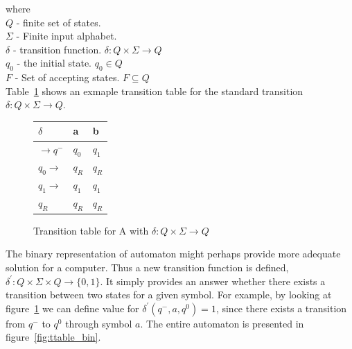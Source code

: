 \documentclass{article}
\begin{document}
where \\
$Q$ - finite set of states. \\
$\Sigma$ - Finite input alphabet. \\
$\delta$ - transition function. $\delta: Q \times \Sigma \rightarrow Q$ \\
$q_0$ - the initial state. $q_0 \in Q$ \\
$F$ - Set of accepting states. $F \subseteq Q$ \\

Table~\ref{fig:ttable_std} shows an exmaple transition table for the standard transition $\delta: Q \times \Sigma \rightarrow Q$.

%
%
\begin{figure}[H]
\CenterFloatBoxes
\begin{floatrow}

\ttabbox
  {
  \centering
  \setlength{\tabcolsep}{15pt}
	\renewcommand{\arraystretch}{1.5}
	\begin{tabular}{|P{1.0cm} || P{0.6cm} | P{0.6cm} |}
	\hline
	$\delta$ & a & b \\
	\hline
	\hline
	$\rightarrow q^-$ 		& $q_0$ & $q_1$ \\
	\hline
	$q_0 \rightarrow$ 		& $q_R$ & $q_R$ \\
	\hline
	$q_1 \rightarrow$ 		& $q_1$ & $q_1$ \\
	\hline
	$q_R$  					& $q_R$ & $q_R$ \\
	\hline
	\end{tabular}
  }
  {\caption{Transition table for A with $\delta: Q \times \Sigma \rightarrow Q$}\label{fig:ttable_std}}


\end{floatrow}
\end{figure}


The binary representation of automaton might perhaps provide more adequate solution for a computer. Thus a new transition function is defined, $\delta^{'}: Q \times \Sigma \times Q \rightarrow \{0,1\}$. It simply provides an answer whether there exists a transition between two states for a given symbol. For example, by looking at figure~\ref{fig:ttable_std} we can define value for $\delta^{'}(q^-,a,q^0) = 1$, since there exists a transition from $q^-$ to $q^0$ through symbol $a$. The entire automaton is presented in figure~\ref{fig:ttable_bin}.
\end{document}
